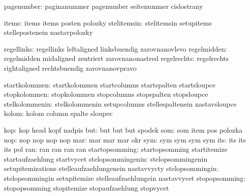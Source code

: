                    pagenumber:  paginanummer                 pagenumber
                                seitenummer                  cislostrany

                        items:  items                        items
                                posten                       polozky
                  stelitemsin:  stelitemsin                  setupitems
                                stellepostenein              nastavpolozky

                   regellinks:  regellinks                   leftaligned
                                linksbuendig                 zarovnanovlevo
                  regelmidden:  regelmidden                  midaligned
                                zentriert                    zarovnanonastred
                  regelrechts:  regelrechts                  rightaligned
                                rechtsbuendig                zarovnanovpravo

                startkolommen:  startkolommen                startcolumns
                                startspalten                 startsloupce
                 stopkolommen:  stopkolommen                 stopcolumns
                                stopspalten                  stopsloupce
               stelkolommenin:  stelkolommenin               setupcolumns
                                stellespaltenein             nastavsloupce
                        kolom:  kolom                        column
                                spalte                       sloupec

                          kop:  kop                          head
                                kopf                         nadpis
                          but:  but                          but
                                but                          spodek %
                          som:  som                          item
                                pos                          polozka
                          nop:  nop                          nop
                                nop                          nop
                          mar:  mar                          mar
                                mar                          okr %
                          sym:  sym                          sym
                                sym                          sym
                          its:  its                          its
                                its                          pol %
                          ran:  ran                          ran
                                ran                          ran
               startopsomming:  startopsomming               startitemize
                                startaufzaehlung             startvycet
            stelopsommingenin:  stelopsommingenin            setupitemizations
                                stelleaufzaehlungenein       nastavvycty
              stelopsommingin:  stelopsommingin              setupitemize
                                stelleaufzaehlungein         nastavvycet
                stopopsomming:  stopopsomming                stopitemize
                                stopaufzaehlung              stopvycet

